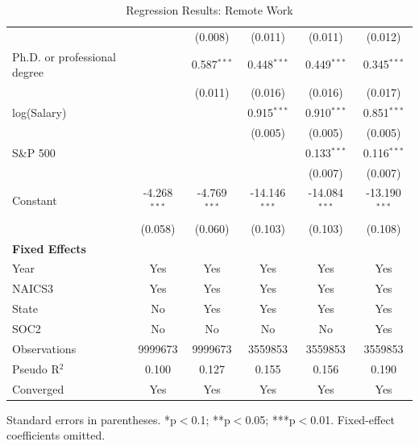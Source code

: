 \begin{table}[!htbp]
\begin{tabular}{lccccc}
 &  & (0.008) & (0.011) & (0.011) & (0.012) \\
Ph.D. or professional degree &  & 0.587$^{***}$ & 0.448$^{***}$ & 0.449$^{***}$ & 0.345$^{***}$ \\
 &  & (0.011) & (0.016) & (0.016) & (0.017) \\
log(Salary) &  &  & 0.915$^{***}$ & 0.910$^{***}$ & 0.851$^{***}$ \\
 &  &  & (0.005) & (0.005) & (0.005) \\
S\&P 500 &  &  &  & 0.133$^{***}$ & 0.116$^{***}$ \\
 &  &  &  & (0.007) & (0.007) \\
Constant & -4.268$^{***}$ & -4.769$^{***}$ & -14.146$^{***}$ & -14.084$^{***}$ & -13.190$^{***}$ \\
 & (0.058) & (0.060) & (0.103) & (0.103) & (0.108) \\
\midrule
\textbf{Fixed Effects} &  &  &  &  &  \\
Year & Yes & Yes & Yes & Yes & Yes \\
NAICS3 & Yes & Yes & Yes & Yes & Yes \\
State & No & Yes & Yes & Yes & Yes \\
SOC2 & No & No & No & No & Yes \\
Observations & 9999673 & 9999673 & 3559853 & 3559853 & 3559853 \\
Pseudo R$^2$ & 0.100 & 0.127 & 0.155 & 0.156 & 0.190 \\
Converged & Yes & Yes & Yes & Yes & Yes \\
\bottomrule
\end{tabular}
\caption{Regression Results: Remote Work}
\par\smallskip\scriptsize Standard errors in parentheses. *p$<$0.1; **p$<$0.05; ***p$<$0.01. Fixed-effect coefficients omitted.
\end{table}